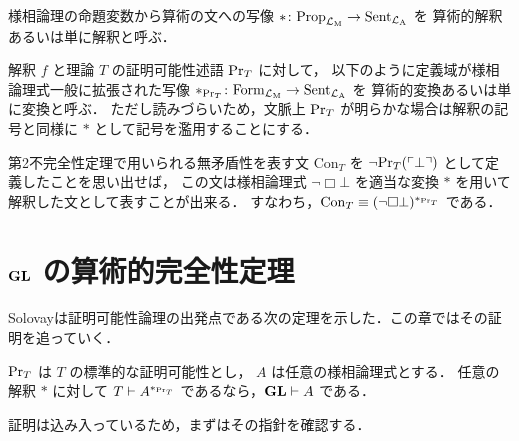 \documentclass{jlreq}
\begin{document}
\begin{definition}
	様相論理の命題変数から算術の文への写像 $* \colon \mathrm{Prop}_{\mathcal{L}_\mathrm{M}} \to \mathrm{Sent}_{\mathcal{L}_\mathrm{A}}$ を
	算術的解釈あるいは単に解釈と呼ぶ．
\end{definition}

\begin{definition}
	解釈 $f$ と理論 $T$ の証明可能性述語 $\mathrm{Pr}_T$ に対して，
	以下のように定義域が様相論理式一般に拡張された写像 $*_{\mathrm{Pr}_T} \colon \mathrm{Form}_{\mathcal{L}_\mathrm{M}} \to \mathrm{Sent}_{\mathcal{L}_\mathrm{A}}$ を
	算術的変換あるいは単に変換と呼ぶ．
	ただし読みづらいため，文脈上 $\mathrm{Pr}_T$ が明らかな場合は解釈の記号と同様に $*$ として記号を濫用することにする．
\end{definition}

\begin{example}
	第2不完全性定理で用いられる無矛盾性を表す文 $\mathrm{Con}_T$ を $\lnot \mathrm{Pr}_T(\ulcorner \bot \urcorner)$ として定義したことを思い出せば，
	この文は様相論理式 $\lnot \Box \bot$ を適当な変換 $*$ を用いて解釈した文として表すことが出来る．
	すなわち，$\mathrm{Con}_T \equiv (\lnot \Box \bot)^{*_{\mathrm{Pr}_T}}$ である．
\end{example}



\section{$\mathbf{GL}$ の算術的完全性定理}

Solovay\cite{solovay_provability_1976}は証明可能性論理の出発点である次の定理を示した．この章ではその証明を追っていく．

\begin{theorem}\label{thm:GL_arith_completeness}
	$\mathrm{Pr}_T$ は $T$ の標準的な証明可能性とし，
	$A$ は任意の様相論理式とする．
	任意の解釈 $*$ に対して $T \vdash A^{*_{\mathrm{Pr}_T}}$ であるなら，$\mathbf{GL} \vdash A$ である．
\end{theorem}

証明は込み入っているため，まずはその指針を確認する．
\end{document}
